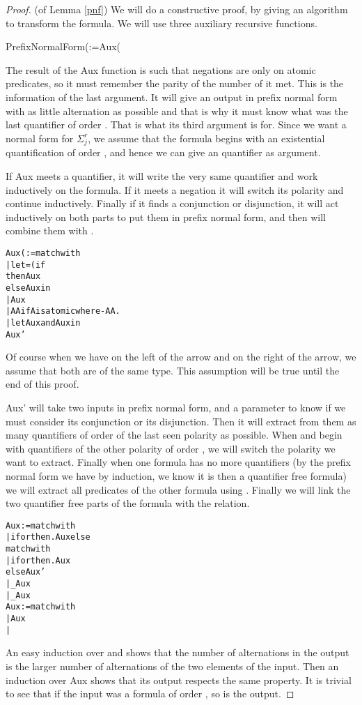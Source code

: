 \documentclass[a4paper,12pt]{article}
\theoremstyle{definition}
\newcommand{\hob}[2]{\ensuremath{\Sigma^{#1}_{#2}}}
\begin{document}
\begin{proof}(of Lemma \ref{pnf}) We will do a constructive proof, by
  giving an algorithm to transform the formula. We will use three
  auxiliary recursive functions.

\begin{texttt}
  PrefixNormalForm(:=Aux(
\end{texttt}

The result of the Aux function is such that negations are only on
atomic predicates, so it must remember the parity of the number of
 it met. This is the information of the last argument. It will
give an output in prefix normal form with as little alternation as
possible and that is why it must know what was the last quantifier of
order . That is what its third argument is for.  Since we want a
normal form for \hob r j, we assume that the formula begins with an
existential quantification of order , and hence we can give an
 quantifier as argument.

If Aux meets a quantifier, it will write the very same quantifier and
work inductively on the formula. If it meets a negation it will switch
its polarity and continue inductively. Finally if it finds a
conjunction or disjunction, it will act inductively on both parts to
put them in prefix normal form, and then will combine them with
.

\begin{alltt}
Aux(:=match  with
  |let =(if 
     then Aux
     else Aux  in 
  | Aux
  |AA   if A is atomic where -AA.
  |let Aux and Aux  in
    Aux'
\end{alltt}

Of course when we have  on the left of the arrow and 
on the right of the arrow, we assume that both  are of the same
type. This assumption will be true until the end of this proof.

Aux' will take two inputs in prefix normal form, and a parameter to
know if we must consider its conjunction or its disjunction. Then it
will extract from them as many quantifiers of order  of the last
seen polarity as possible. When  and  begin with
quantifiers of the other polarity of order , we will switch the
polarity we want to extract. Finally when one formula has no more
quantifiers (by the prefix normal form we have by induction, we know
it is then a quantifier free formula) we will extract all predicates
of the other formula using .  Finally we
will link the two quantifier free parts of the formula with the
 relation.
\begin{alltt}
Aux:= match  with 
  |if  or  then .Aux else
    match  with
      |if  or  then .Aux
        else Aux'
      |\_Aux
  |\_Aux
Aux:= match  with 
  |Aux
  |
\end{alltt}
An easy induction over  and
 shows that the number of alternations in the
output is the larger number of alternations of the two elements of the
input.  Then an induction over Aux shows that its output respects the
same property. It is trivial to see that if the input was a formula of
order , so is the output.
\end{proof}
\end{document}
